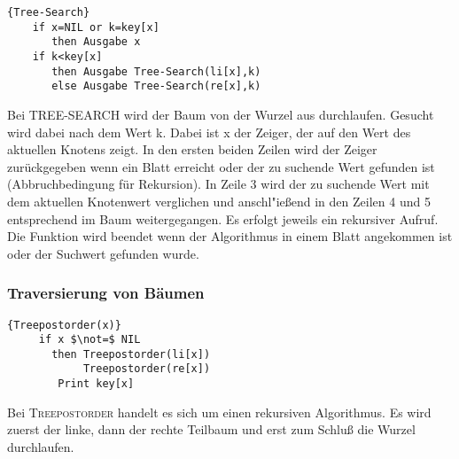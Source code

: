 \documentclass[ngerman,draft,parskip=half*,twoside]{scrreprt}
\theoremstyle{break}
\begin{document}
  \begin{Algorithmus}[H]
    \begin{lstlisting}[frame=tlrb, mathescape=true, title=\textsc{Tree-Search}, gobble=4]{Tree-Search}
    if x=NIL or k=key[x]
       then Ausgabe x
    if k<key[x]
       then Ausgabe Tree-Search(li[x],k)
       else Ausgabe Tree-Search(re[x],k)
    \end{lstlisting}

    Bei \textsc{TREE-SEARCH} wird der Baum von der Wurzel aus durchlaufen. 
    Gesucht wird dabei nach dem Wert k. Dabei ist x der Zeiger, der auf den 
    Wert des aktuellen Knotens zeigt. In den ersten beiden Zeilen 
    wird der Zeiger zurückgegeben wenn ein Blatt erreicht oder der 
    zu suchende Wert gefunden ist (Abbruchbedingung für Rekursion). In 
    Zeile 3 wird der zu suchende Wert mit dem aktuellen Knotenwert 
    verglichen und anschl"ießend in den Zeilen 4 und 5 entsprechend im 
    Baum weitergegangen. Es erfolgt jeweils ein rekursiver Aufruf.\\
    Die Funktion wird beendet wenn der Algorithmus in einem Blatt 
    angekommen ist oder der Suchwert gefunden wurde.
    \end{Algorithmus}
 
 \subsubsection{Traversierung von Bäumen}
   \begin{Algorithmus}[H]
   \begin{lstlisting}[frame=tlrb, mathescape=true, title=\textsc{Treepostorder\textnormal{(x)}}, gobble=4]{Treepostorder(x)}
     if x $\not=$ NIL
       then Treepostorder(li[x])
            Treepostorder(re[x])
	    Print key[x]
    \end{lstlisting}

   Bei \textsc{Treepostorder} handelt es sich um einen rekursiven Algorithmus.
   Es wird zuerst der linke, dann der rechte Teilbaum und erst zum Schluß die Wurzel durchlaufen.
   \end{Algorithmus}
\end{document}
